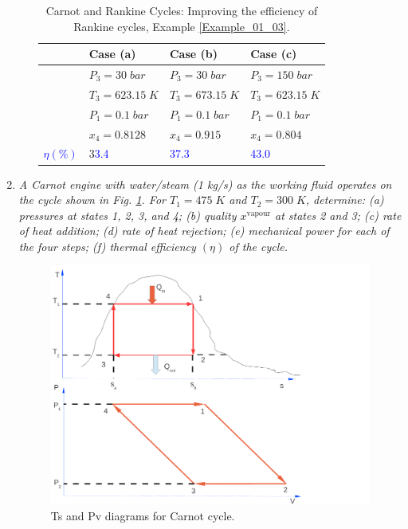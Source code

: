 \begin{enumerate}
\begin{enumerate}
\begin{table}
\begin{center}
\begin{tabular}{c |l l l }
\hline
          &  {\bf Case (a)}      &  {\bf Case (b) }     &  {\bf Case (c) }    \\ 
\hline 
          &   $P_{3}=30\;bar$     &  $P_{3}=30\;bar$     &  $P_{3}=150\;bar$    \\
          &   $T_{3}=623.15\;K$   &  $T_{3}=673.15\;K$   &  $T_{3}=623.15\;K$   \\
          &   $P_{1}=0.1\;bar$    &  $P_{1}=0.1\;bar$    &  $P_{1}=0.1\;bar$    \\
          &   $x_{4}=0.8128$      &   $x_{4}=0.915$      &  $x_{4}=0.804$       \\
\hline
\textcolor{blue}{$\eta \left(\%\right)$} &3\textcolor{blue}{3.4} &\textcolor{blue}{37.3}& \textcolor{blue}{43.0}      \\
\end{tabular}
\end{center}
\caption{Carnot and Rankine Cycles: Improving the efficiency of Rankine cycles, Example \ref{Example_01_03}.}
\label{Example01_01:Table2}
\end{table}



\end{enumerate}


\item {\it A Carnot engine with water/steam (1 kg/s) as the working fluid operates on the cycle shown in Fig. \ref{PVTSDiags}. For $T_{1}=475\;K$ and $T_{2}=300\;K$, determine: (a) pressures at states 1, 2, 3, and 4; (b) quality $x^{\text{vapour}}$ at states 2 and 3; (c) rate of heat addition; (d) rate of heat rejection; (e) mechanical power for each of the four steps; (f) thermal efficiency $\left(\eta\right)$ of the cycle.}
   \begin{figure}[h]
    \begin{center}
     \includegraphics[width=12.cm,clip]{./Pics/Carnot_PV_TS}
    \end{center}
    \caption{Ts and Pv diagrams for Carnot cycle.}\label{PVTSDiags}
   \end{figure}    


\end{enumerate}
